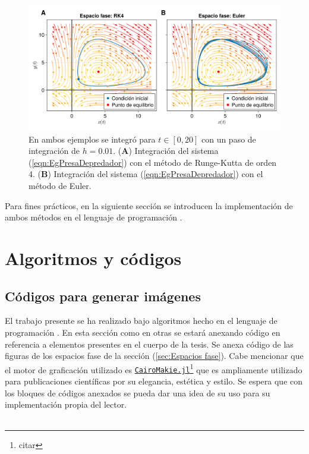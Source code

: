\begin{figure}[h!]
	\centering
	\includegraphics[scale=0.23]{../Imagenes/RK4vsEuler}
	\caption{En ambos ejemplos se integró para $t\in[0,20]$ con un paso de integración de $h=0.01$. (\textbf{A}) Integración del sistema (\ref{eqn:EgPresaDepredador}) con el método de Runge-Kutta de orden 4. (\textbf{B}) Integración del sistema (\ref{eqn:EgPresaDepredador}) con el método de Euler.}
	\label{fig:Rk4vsEuler}
\end{figure}

Para fines prácticos, en la siguiente sección se introducen la implementación de ambos métodos en el lenguaje de programación \julia.

\section{Algoritmos y códigos}

\subsection{Códigos para generar imágenes}
El trabajo presente se ha realizado bajo algoritmos hecho en el lenguaje de programación \julia. En esta sección como en otras se estará anexando código en referencia a elementos presentes en el cuerpo de la tesis. Se anexa código de las figuras de los espacios fase de la sección (\ref{sec:Espacios fase}). Cabe mencionar que el motor de graficación utilizado es \href{https://github.com/JuliaPlots/CairoMakie.jl}{\texttt{CairoMakie.jl}}\footnote{citar} que es ampliamente utilizado para publicaciones científicas por su elegancia, estética y estilo. Se espera que con los bloques de códigos anexados se pueda dar una idea de su uso para su implementación propia del lector.\\
\\
